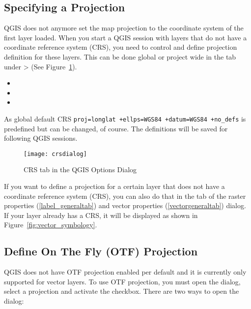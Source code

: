 \subsection{Specifying a Projection}
\label{sec:projection-specifying}

QGIS does not anymore set the map projection to the coordinate system of the
first layer loaded. When you start a QGIS session with layers that do not
have a coordinate reference system (CRS), you need to control and define
projection definition for these layers. This can be done global or project
wide in the  tab under  >
 (See Figure~\ref{fig:crsdialog}). 

\begin{itemize}
\item {} 
\item {}
\item {}
\end{itemize}

As global default CRS \texttt{proj=longlat +ellps=WGS84 +datum=WGS84
+no\_defs} is predefined but can be changed, of course. The definitions will
be saved for following QGIS sessions.    

\begin{figure}[ht]
   \begin{center}
   \caption{CRS tab in the QGIS Options Dialog \nixcaption}\label{fig:crsdialog}\smallskip
   \texttt{[image: crsdialog]}
\end{center}
\end{figure}

If you want to define a projection for a certain layer that does not have a
coordinate reference system (CRS), you can also do that in the 
tab of the raster properties (\ref{label_generaltab}) and vector properties
(\ref{vectorgeneraltab}) dialog. If your layer already has a CRS, it will be
displayed as shown in Figure~\ref{fig:vector_symbology}.

\subsection{Define On The Fly (OTF) Projection}\label{label_projstart}

QGIS does not have OTF projection enabled per default and it is currently
only supported for vector layers. To use OTF projection, you must open the
 dialog, select a
projection and activate the  checkbox.
There are two ways to open the dialog:

